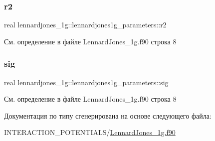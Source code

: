 \subsubsection{\texorpdfstring{r2}{r2}}
{\footnotesize\ttfamily real lennardjones\+\_\+1g\+::lennardjones1g\+\_\+parameters\+::r2}



См. определение в файле Lennard\+Jones\+\_\+1g.\+f90 строка 8

\mbox{\label{structlennardjones__1g_1_1lennardjones1g__parameters_a88ba8f2d417b65ea5e0aa07171954a15}} 
\subsubsection{\texorpdfstring{sig}{sig}}
{\footnotesize\ttfamily real lennardjones\+\_\+1g\+::lennardjones1g\+\_\+parameters\+::sig}



См. определение в файле Lennard\+Jones\+\_\+1g.\+f90 строка 8



Документация по типу сгенерирована на основе следующего файла\+:\begin{DoxyCompactItemize}
\item 
I\+N\+T\+E\+R\+A\+C\+T\+I\+O\+N\+\_\+\+P\+O\+T\+E\+N\+T\+I\+A\+L\+S/\mbox{\hyperlink{_lennard_jones__1g_8f90}{Lennard\+Jones\+\_\+1g.\+f90}}\end{DoxyCompactItemize}

